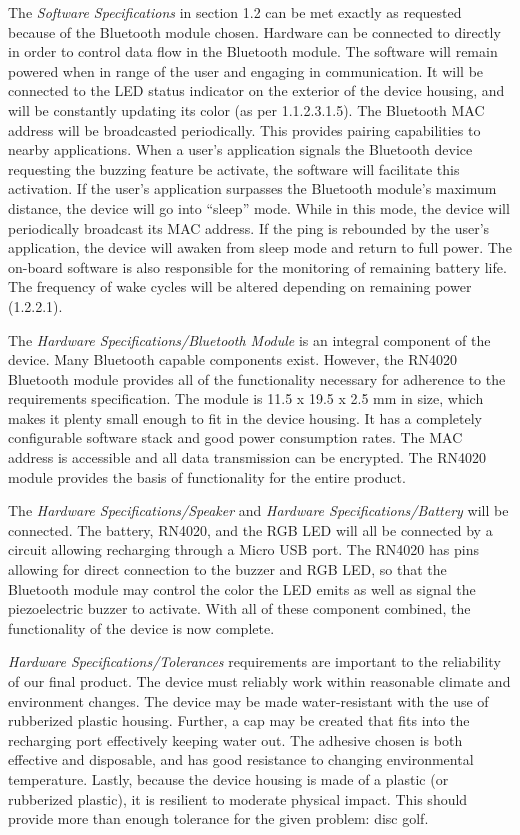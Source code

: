 \documentclass[12pt]{article}
\begin{document}
The \emph{Software Specifications} in section 1.2 can be met exactly as requested because of the Bluetooth module chosen. Hardware can be connected to directly in order to control data flow in the Bluetooth module. The software will remain powered when in range of the user and engaging in communication. It will be connected to the LED status indicator on the exterior of the device housing, and will be constantly updating its color (as per 1.1.2.3.1.5). The Bluetooth MAC address will be broadcasted periodically. This provides pairing capabilities to nearby applications. When a user’s application signals the Bluetooth device requesting the buzzing feature be activate, the software will facilitate this activation. If the user’s application surpasses the Bluetooth module’s maximum distance, the device will go into “sleep” mode. While in this mode, the device will periodically broadcast its MAC address. If the ping is rebounded by the user’s application, the device will awaken from sleep mode and return to full power. The on-board software is also responsible for the monitoring of remaining battery life. The frequency of wake cycles will be altered depending on remaining power (1.2.2.1).


The \emph{Hardware Specifications/Bluetooth Module} is an integral component of the device. Many Bluetooth capable components exist. However, the RN4020 Bluetooth module provides all of the functionality necessary for adherence to the requirements specification. The module is 11.5 x 19.5 x 2.5 mm in size, which makes it plenty small enough to fit in the device housing. It  has a completely configurable software stack and good power consumption rates. The MAC address is accessible and all data transmission can be encrypted. The RN4020 module provides the basis of functionality for the entire product.

The \emph{Hardware Specifications/Speaker} and \emph{Hardware Specifications/Battery} will be connected. The battery, RN4020, and the RGB LED will all be connected by a circuit allowing recharging through a Micro USB port. The RN4020 has pins allowing for direct connection to the buzzer and RGB LED, so that the Bluetooth module may control the color the LED emits as well as signal the piezoelectric buzzer to activate. With all of these component combined, the functionality of the device is now complete.


\emph{Hardware Specifications/Tolerances} requirements are important to the reliability of our final product. The device must reliably work within reasonable climate and environment changes. The device may be made water-resistant with the use of rubberized plastic housing. Further, a cap may be created that fits into the  recharging port effectively keeping water out. The adhesive chosen is both effective and disposable, and has good resistance to changing environmental temperature. Lastly, because the device housing is made of a plastic (or rubberized plastic), it is resilient to moderate physical impact. This should provide more than enough tolerance for the given problem: disc golf.
\end{document}
